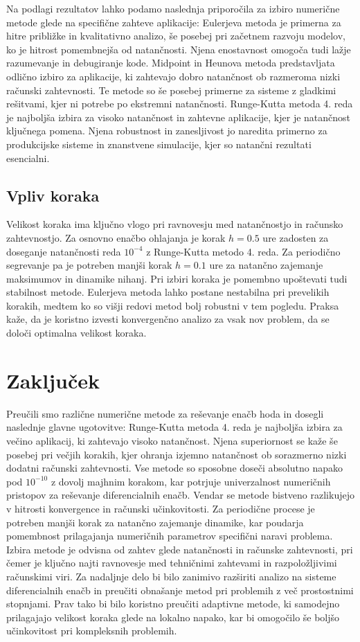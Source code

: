 \documentclass[12pt,a4paper]{article}
\begin{document}
Na podlagi rezultatov lahko podamo naslednja priporočila za izbiro numerične metode 
glede na specifične zahteve aplikacije:
Eulerjeva metoda je primerna za hitre približke in kvalitativno analizo, 
še posebej pri začetnem razvoju modelov, ko je hitrost pomembnejša od natančnosti. 
Njena enostavnost omogoča tudi lažje razumevanje in debugiranje kode.
Midpoint in Heunova metoda predstavljata odlično izbiro za aplikacije, 
ki zahtevajo dobro natančnost ob razmeroma nizki računski zahtevnosti. 
Te metode so še posebej primerne za sisteme z gladkimi rešitvami, 
kjer ni potrebe po ekstremni natančnosti.
Runge-Kutta metoda 4. reda je najboljša izbira za visoko natančnost 
in zahtevne aplikacije, kjer je natančnost ključnega pomena. 
Njena robustnost in zanesljivost jo naredita primerno za produkcijske sisteme 
in znanstvene simulacije, kjer so natančni rezultati esencialni.

\subsection{Vpliv koraka}

Velikost koraka ima ključno vlogo pri ravnovesju med natančnostjo in računsko zahtevnostjo. 
Za osnovno enačbo ohlajanja je korak $h = 0.5$ ure zadosten 
za doseganje natančnosti reda $10^{-4}$ z Runge-Kutta metodo 4. reda. 
Za periodično segrevanje pa je potreben manjši korak $h = 0.1$ ure 
za natančno zajemanje maksimumov in dinamike nihanj.
Pri izbiri koraka je pomembno upoštevati tudi stabilnost metode. 
Eulerjeva metoda lahko postane nestabilna pri prevelikih korakih, 
medtem ko so višji redovi metod bolj robustni v tem pogledu. 
Praksa kaže, da je koristno izvesti konvergenčno analizo za vsak nov problem, 
da se določi optimalna velikost koraka.

\section{Zaključek}

Preučili smo različne numerične metode za reševanje enačb hoda 
in dosegli naslednje glavne ugotovitve:
Runge-Kutta metoda 4. reda je najboljša izbira za večino aplikacij, 
ki zahtevajo visoko natančnost. 
Njena superiornost se kaže še posebej pri večjih korakih, 
kjer ohranja izjemno natančnost ob sorazmerno nizki dodatni računski zahtevnosti.
Vse metode so sposobne doseči absolutno napako pod $10^{-10}$ 
z dovolj majhnim korakom, kar potrjuje univerzalnost numeričnih pristopov 
za reševanje diferencialnih enačb. 
Vendar se metode bistveno razlikujejo v hitrosti konvergence in računski učinkovitosti.
Za periodične procese je potreben manjši korak za natančno zajemanje dinamike, 
kar poudarja pomembnost prilagajanja numeričnih parametrov specifični naravi problema. 
Izbira metode je odvisna od zahtev glede natančnosti in računske zahtevnosti, 
pri čemer je ključno najti ravnovesje med tehničnimi zahtevami 
in razpoložljivimi računskimi viri.
Za nadaljnje delo bi bilo zanimivo razširiti analizo na sisteme diferencialnih enačb 
in preučiti obnašanje metod pri problemih z več prostostnimi stopnjami. 
Prav tako bi bilo koristno preučiti adaptivne metode, 
ki samodejno prilagajajo velikost koraka glede na lokalno napako, 
kar bi omogočilo še boljšo učinkovitost pri kompleksnih problemih.
\end{document}
